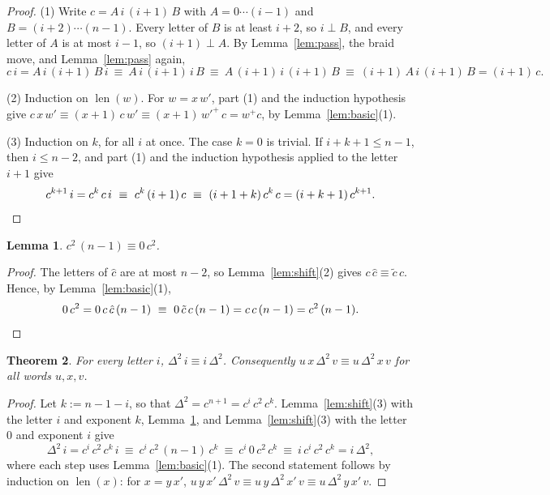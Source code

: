 \documentclass[11pt]{amsart}
\newtheorem{theorem}{Theorem}[section]
\newtheorem{lemma}[theorem]{Lemma}
\theoremstyle{definition}
\theoremstyle{remark}
\newcommand{\eqb}{\equiv}
\DeclareMathOperator{\len}{len}
\begin{document}
\begin{proof}
(1) Write $c=A\,i\,(i+1)\,B$ with $A=0\cdots(i-1)$ and $B=(i+2)\cdots(n-1)$. Every letter of $B$ is
at least $i+2$, so $i\perp B$, and every letter of $A$ is at most $i-1$, so $(i+1)\perp A$. By
Lemma~\ref{lem:pass}, the braid move, and Lemma~\ref{lem:pass} again,
\[
c\,i=A\,i\,(i+1)\,B\,i\ \eqb\ A\,i\,(i+1)\,i\,B\ \eqb\ A\,(i+1)\,i\,(i+1)\,B\ \eqb\
(i+1)\,A\,i\,(i+1)\,B=(i+1)\,c .
\]

(2) Induction on $\len(w)$. For $w=x\,w'$, part (1) and the induction hypothesis give
$c\,x\,w'\eqb(x+1)\,c\,w'\eqb(x+1)\,w'^{+}\,c=w^+c$, by Lemma~\ref{lem:basic}(1).

(3) Induction on $k$, for all $i$ at once. The case $k=0$ is trivial. If $i+k+1\le n-1$, then
$i\le n-2$, and part (1) and the induction hypothesis applied to the letter $i+1$ give
\[
c^{k+1}\,i=c^k\,c\,i\ \eqb\ c^k\,(i+1)\,c\ \eqb\ (i+1+k)\,c^k\,c=(i+k+1)\,c^{k+1}. \qedhere
\]
\end{proof}

\begin{lemma}\label{lem:wrap}
$c^2\,(n-1)\eqb 0\,c^2$.
\end{lemma}

\begin{proof}
The letters of $\hat c$ are at most $n-2$, so Lemma~\ref{lem:shift}(2) gives $c\,\hat c\eqb\tilde c\,c$.
Hence, by Lemma~\ref{lem:basic}(1),
\[
0\,c^2=0\,c\,\hat c\,(n-1)\ \eqb\ 0\,\tilde c\,c\,(n-1)=c\,c\,(n-1)=c^2\,(n-1). \qedhere
\]
\end{proof}

\begin{theorem}\label{thm:central}
For every letter $i$, $\Delta^2\,i\eqb i\,\Delta^2$. Consequently
$u\,x\,\Delta^2\,v\eqb u\,\Delta^2\,x\,v$ for all words $u,x,v$.
\end{theorem}

\begin{proof}
Let $k:=n-1-i$, so that $\Delta^2=c^{n+1}=c^i\,c^2\,c^k$. Lemma~\ref{lem:shift}(3) with the letter
$i$ and exponent $k$, Lemma~\ref{lem:wrap}, and Lemma~\ref{lem:shift}(3) with the letter $0$ and
exponent $i$ give
\[
\Delta^2\,i=c^i\,c^2\,c^k\,i\ \eqb\ c^i\,c^2\,(n-1)\,c^k\ \eqb\ c^i\,0\,c^2\,c^k\ \eqb\
i\,c^i\,c^2\,c^k=i\,\Delta^2 ,
\]
where each step uses Lemma~\ref{lem:basic}(1). The second statement follows by induction on
$\len(x)$: for $x=y\,x'$,
$u\,y\,x'\,\Delta^2\,v\eqb u\,y\,\Delta^2\,x'\,v\eqb u\,\Delta^2\,y\,x'\,v$.
\end{proof}
\end{document}
